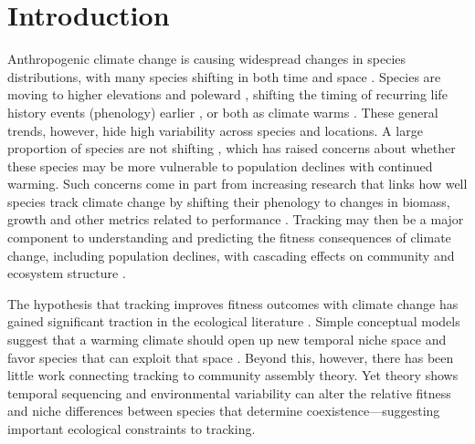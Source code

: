 \documentclass[11pt,letterpaper]{article}
\newcommand{\R}[1]{\label{}\linelabel{#1}}
\begin{document}
\newpage
\linenumbers %
\section{Introduction}
Anthropogenic climate change is causing widespread changes in species distributions, with many species shifting in both time and space \citep{IPCC:2014sm,ipcc1point5}. Species are moving to higher elevations and poleward \citep{Chen2011}, shifting the timing of recurring life history events (phenology) earlier \citep{Wolkovich:2012n,cohen2018}, or both as climate warms \citep{amano2014,socolar2017}. These general trends, however, hide high variability across species and locations. A large proportion of species are not shifting \citep{Cook:2012pnas,amano2014}, which has raised concerns about whether these species may be more vulnerable to population declines with continued warming. Such concerns come in part from increasing research that links how well species track climate change by shifting their phenology to changes in biomass, growth and other metrics related to performance \citep{Cleland:2012}. Tracking may then be a major component to understanding and predicting the fitness consequences of climate change, including population declines, with cascading effects on community and ecosystem structure \citep{Menzel:2006xn,Parmesan:2006cr}. 

The hypothesis that tracking improves fitness outcomes with climate change has gained significant traction in the ecological literature \citep[e.g.,][]{Cleland:2012}. \R{r2stat}Simple conceptual models suggest that a warming climate should open up new temporal niche space and favor species that can exploit that space \citep{gotelli1996,wolkovich:2010fee,Zettlemoyer2019}.  Beyond this, however, there has been little work connecting tracking to community assembly theory. Yet theory shows temporal sequencing and environmental variability can alter the relative fitness and niche differences between species that determine coexistence---suggesting important ecological constraints to tracking.\R{r2statend} %
\end{document}

